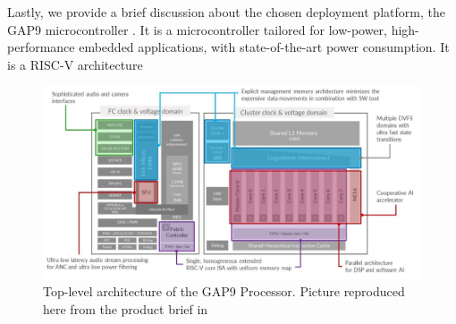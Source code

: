 Lastly, we provide a brief discussion about the chosen deployment platform, the GAP9 microcontroller \cite{GWGAP9}. 
It is a microcontroller tailored for low-power, high-performance embedded applications, with state-of-the-art power consumption. It is a RISC-V architecture

\begin{figure}[h!]
    \centering
    \includegraphics[width=\textwidth]{fig/gap9_toplevel.png}
    \caption{Top-level architecture of the GAP9 Processor. Picture reproduced here from the product brief in \cite{GWGAP9}}
    \label{fig:gap9_toplevel}
\end{figure}